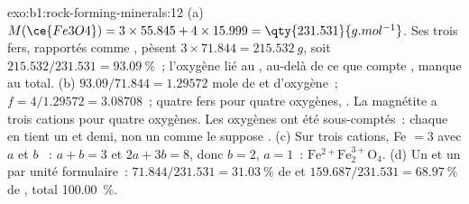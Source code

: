 \begin{solution}{exo:b1:rock-forming-minerals:12}
(a) $M(\ce{Fe3O4}) = 3\times55.845 + 4\times15.999 = \qty{231.531}{g.mol^{-1}}$.
Ses trois fers, rapportés comme , pèsent $3\times71.844 = \qty{215.532}{g}$,
soit $215.532/231.531 = \qty{93.09}{\percent}$~; l'oxygène lié au
, au-delà de ce que compte , manque au total.
(b) $93.09/71.844 = 1.29572$ mole de  et d'oxygène~; $f =
4/1.29572 = 3.08708$~; quatre fers pour quatre oxygènes, . La magnétite
a trois cations pour quatre oxygènes. Les oxygènes ont été sous-comptés~: chaque
 en tient un et demi, non un comme le suppose . (c) Sur trois
cations, Fe $= 3$ avec $a$  et $b$ ~: $a + b = 3$ et
$2a + 3b = 8$, donc $b = 2$, $a = 1$~: $\mathrm{Fe^{2+}Fe^{3+}_2O_4}$. (d) Un
 et un  par unité formulaire~: $71.844/231.531 = \qty{31.03}{\percent}$
de  et $159.687/231.531 = \qty{68.97}{\percent}$ de , total
\qty{100.00}{\percent}.
\end{solution}

